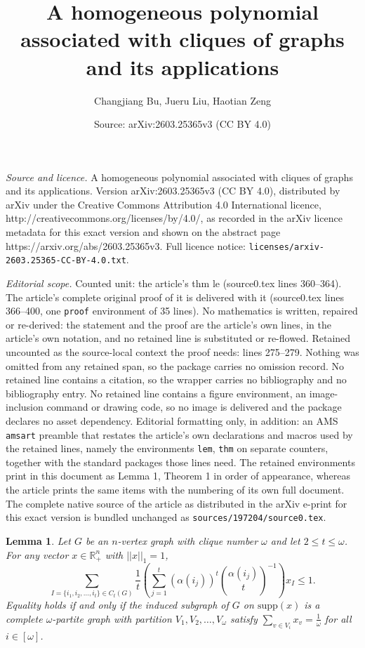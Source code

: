 \documentclass[10pt,a4paper]{amsart}
\title{A homogeneous polynomial associated with cliques of graphs and its applications}
\author{Changjiang Bu, Jueru Liu, Haotian Zeng}
\date{Source: arXiv:2603.25365v3 (CC BY 4.0)}
\newtheorem{lem}{Lemma}
\begin{document}
\maketitle

\noindent\emph{Source and licence.} A homogeneous polynomial associated with cliques of graphs and its applications. Version arXiv:2603.25365v3 (CC BY 4.0), distributed by arXiv under the Creative Commons Attribution 4.0 International licence, http://creativecommons.org/licenses/by/4.0/, as recorded in the arXiv licence metadata for this exact version and shown on the abstract page https://arxiv.org/abs/2603.25365v3. Full licence notice: \texttt{licenses/arxiv-2603.25365-CC-BY-4.0.txt}.\par\smallskip

\noindent\textit{Editorial scope.} Counted unit: the article's thm le (source0.tex lines 360--364). The article's complete original proof of it is delivered with it (source0.tex lines 366--400, one \texttt{proof} environment of 35 lines). No mathematics is written, repaired or re-derived: the statement and the proof are the article's own lines, in the article's own notation, and no retained line is substituted or re-flowed.  Retained uncounted as the source-local context the proof needs: lines 275--279.  Nothing was omitted from any retained span, so the package carries no omission record.  No retained line contains a citation, so the wrapper carries no bibliography and no bibliography entry.  No retained line contains a figure environment, an image-inclusion command or drawing code, so no image is delivered and the package declares no asset dependency.  Editorial formatting only, in addition: an AMS \texttt{amsart} preamble that restates the article's own declarations and macros used by the retained lines, namely the environments \texttt{lem}, \texttt{thm} on separate counters, together with the standard packages those lines need.  The retained environments print in this document as Lemma 1, Theorem 1 in order of appearance, whereas the article prints the same items with the numbering of its own full document.  The complete native source of the article as distributed in the arXiv e-print for this exact version is bundled unchanged as \texttt{sources/197204/source0.tex}.
\begin{lem}\label{w2}
Let $G$ be an $n$-vertex graph with clique number $\omega$ and let $2\le t\le\omega$. For any vector $x\in\mathbb{R}^{n}_{+}$ with $||x||_1=1$,
$$\sum_{I=\{i_1,i_2,\ldots,i_t\}\in C_t(G)} \frac{1}{t} \left(\sum_{j=1}^{t}\left(\alpha(i_j)\right)^t\binom{\alpha(i_j)}{t}^{-1}\right)x_I\le 1.$$
Equality holds if and only if the induced subgraph of $G$ on $\mathrm{supp}(x)$ is a complete $\omega$-partite graph with partition $V_1, V_2, \ldots, V_{\omega}$ satisfy $\sum_{v\in V_i}x_v=\frac{1}{\omega}$ for all $i\in[\omega]$.
\end{lem}
\end{document}
